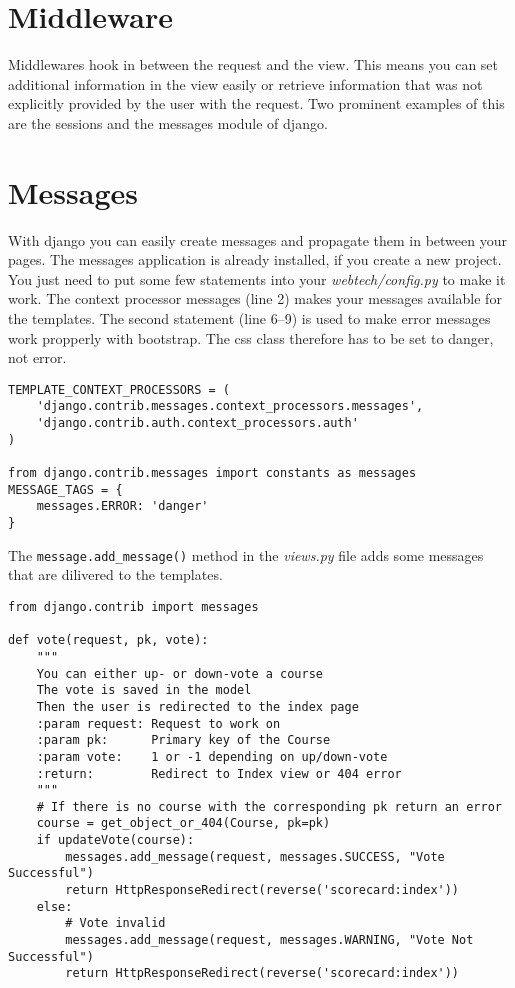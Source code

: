 \section{Middleware}
\label{sec:middleware}

Middlewares hook in between the request and the view. This means you can set additional information in the view easily or retrieve information that was not explicitly provided by the user with the request. Two prominent examples of this are the sessions and the messages module of django.

\section{Messages}

With django you can easily create messages and propagate them in between your pages. The messages application is already installed, if you create a new project. You just need to put some few statements into your \emph{webtech/config.py} to make it work. The context processor messages (line 2) makes your messages available for the templates. The second statement (line 6--9) is used to make error messages work propperly with bootstrap. The css class therefore has to be set to danger, not error.
\begin{lstlisting}[style=Python, caption=webtech/config.py, label=lst:config.py1]
TEMPLATE_CONTEXT_PROCESSORS = (
    'django.contrib.messages.context_processors.messages',
    'django.contrib.auth.context_processors.auth'
)

from django.contrib.messages import constants as messages
MESSAGE_TAGS = {
    messages.ERROR: 'danger'
}
\end{lstlisting}

The \lstinline|message.add_message()| method in the \emph{views.py} file adds some messages that are dilivered to the templates.
\begin{lstlisting}[style=Python, caption=Add messages to views, label=lst:views_msg]
from django.contrib import messages

def vote(request, pk, vote):
    """
    You can either up- or down-vote a course
    The vote is saved in the model
    Then the user is redirected to the index page
    :param request: Request to work on
    :param pk:      Primary key of the Course
    :param vote:    1 or -1 depending on up/down-vote
    :return:        Redirect to Index view or 404 error
    """
    # If there is no course with the corresponding pk return an error
    course = get_object_or_404(Course, pk=pk)
    if updateVote(course):
        messages.add_message(request, messages.SUCCESS, "Vote Successful")
        return HttpResponseRedirect(reverse('scorecard:index'))
    else:
        # Vote invalid
        messages.add_message(request, messages.WARNING, "Vote Not Successful")
        return HttpResponseRedirect(reverse('scorecard:index'))
\end{lstlisting}

